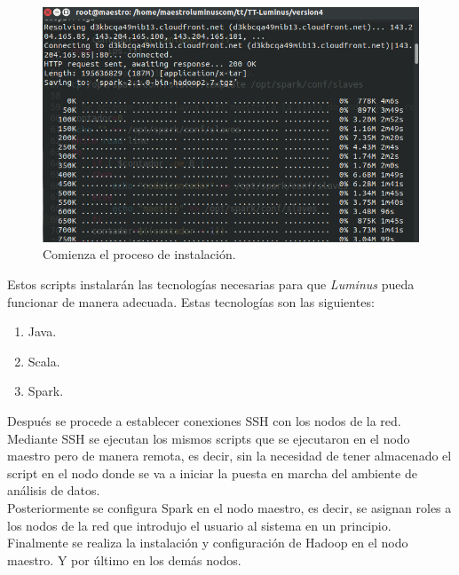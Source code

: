 \begin{figure}[H]
	\hypertarget{fig:instalacion}{\hspace{1pt}}
	\begin{center}	
		\includegraphics[width=.7\textwidth]{capitulo5/images/instalacion.png}
		\caption{Comienza el proceso de instalación.}
	\end{center}
\end{figure}

Estos scripts instalarán las tecnologías necesarias para que \emph{Luminus} pueda funcionar de manera adecuada. Estas tecnologías son las siguientes:\\

\begin{enumerate}
	\item Java.\\
	\item Scala.\\
	\item Spark.\\
\end{enumerate}

Después se procede a establecer conexiones SSH con los nodos de la red. Mediante SSH se ejecutan los mismos scripts que se ejecutaron en el nodo maestro pero de manera remota, es decir, sin la necesidad de tener almacenado el script en el nodo donde se va a iniciar la puesta en marcha del ambiente de análisis de datos.\\

Posteriormente se configura Spark en el nodo maestro, es decir, se asignan roles a los nodos de la red que introdujo el usuario al sistema en un principio.\\

Finalmente se realiza la instalación y configuración de Hadoop en el nodo maestro. Y por último en los demás nodos.

\newpage
